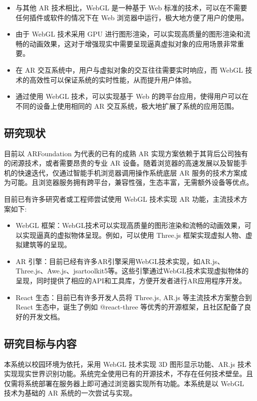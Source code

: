 \begin{itemize}
  \item 与其他 AR 技术相比，WebGL 是一种基于 Web 标准的技术，可以在不需要任何插件或软件的情况下在 Web 浏览器中运行，极大地方便了用户的使用。
  \item 由于 WebGL 技术采用 GPU 进行图形渲染，可以实现高质量的图形渲染和流畅的动画效果，这对于增强现实中需要呈现逼真虚拟对象的应用场景非常重要。
  \item 在 AR 交互系统中，用户与虚拟对象的交互往往需要实时响应，而 WebGL 技术的高效性可以保证系统的实时性能，从而提升用户体验。
  \item 通过使用 WebGL 技术，可以实现基于 Web 的跨平台应用，使得用户可以在不同的设备上使用相同的 AR 交互系统，极大地扩展了系统的应用范围。
\end{itemize}

\subsection{研究现状}

目前以 ARFoundation 为代表的已有的成熟 AR 实现方案依赖于其背后公司独有的闭源技术，或者需要昂贵的专业 AR 设备。随着浏览器的高速发展以及智能手机的快速迭代，仅通过智能手机浏览器调用操作系统底层 AR 服务的技术方案成为可能\cite{ARMobile}。且浏览器服务拥有跨平台，兼容性强，生态丰富，无需额外设备等优点。

目前已有许多研究者或工程师尝试使用 WebGL 技术实现 AR 功能，主流技术方案如下:
\begin{itemize}
  \item WebGL 框架：WebGL技术可以实现高质量的图形渲染和流畅的动画效果，可以实现逼真的虚拟物体呈现。例如，可以使用 Three.js 框架实现虚拟人物、虚拟建筑等的呈现。
  \item AR 引擎：目前已经有许多AR引擎采用WebGL技术实现，如AR.js、Three.js、Awe.js、jsartoolkit5等。这些引擎通过WebGL技术实现虚拟物体的呈现，同时提供了相应的API和工具库，方便开发者进行AR应用程序开发。
  \item React 生态：目前已有许多开发人员将 Three.js, AR.js 等主流技术方案整合到 React 生态中，诞生了例如 @react-three 等优秀的开源框架，且社区配备了良好的开发文档。
\end{itemize}

\subsection{研究目标与内容}

本系统以校园环境为依托，采用 WebGL 技术实现 3D 图形显示功能、AR.js 技术实现现实世界识别功能。系统完全使用已有的开源技术，不存在任何技术壁垒。且仅需将系统部署在服务器上即可通过浏览器实现所有功能。本系统是以 WebGL 技术为基础的 AR 系统的一次尝试与实现。

